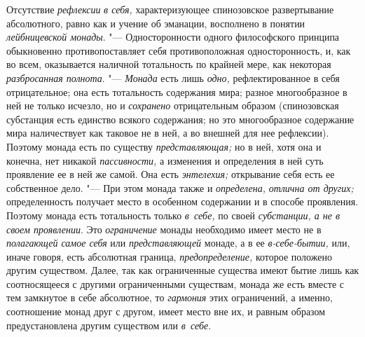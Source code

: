 Отсутствие {\em рефлексии} {\em в
себя,} характеризующее спинозовское развертывание абсолютного, равно как и
учение об эманации, восполнено в понятии
{\em лейбницевской монады}. "--- Односторонности одного
философского принципа обыкновенно противопоставляет себя противоположная
односторонность, и, как во всем, оказывается наличной тотальность по
крайней мере, как некоторая {\em разбросанная
полнота}. "--- {\em Монада} есть лишь
{\em одно,} рефлектированное в себя отрицательное; она
есть тотальность содержания мира; разное многообразное в ней не только
исчезло, но и {\em сохранено} отрицательным образом
(спинозовская субстанция есть единство всякого содержания; но это
многообразное содержание мира наличествует как таковое не в ней, а во
внешней для нее рефлексии). Поэтому монада есть по существу
{\em представляющая;} но в ней, хотя она и конечна, нет
никакой {\em пассивности,} а изменения и определения в
ней суть проявление ее в ней же самой. Она есть
{\em энтелехия;} открывание себя есть ее собственное
дело. "--- При этом монада также и {\em определена,}
{\em отлична от других;} определенность получает место
в особенном содержании и в способе проявления. Поэтому монада есть
тотальность только {\em в~себе,} по своей
{\em субстанции, а не в своем проявлении}. Это
{\em ограничение} монады необходимо имеет место не в
{\em полагающей самое себя} или
{\em представляющей} монаде, а в ее
{\em в-себе-бытии,} или, иначе говоря, есть абсолютная
граница, {\em предопределение,} которое положено
другим существом. Далее, так как ограниченные существа имеют бытие лишь как
соотносящееся с другими ограниченными существам, монада же есть вместе с
тем замкнутое в себе абсолютное, то {\em гармония} этих
ограничений, а именно, соотношение монад друг с другом, имеет место вне их,
и равным образом предустановлена другим существом или
{\em в~себе}.

